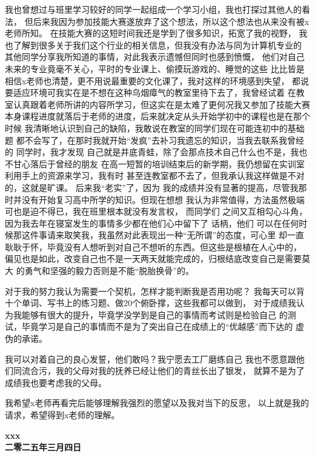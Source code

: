 \documentclass[a4paper]{article}
\begin{document}
我也曾想过与班里学习较好的同学一起组成一个学习小组，我也打探过其他人的看法，
但后来我因为参加技能大赛遂放弃了这个想法，所以这个想法也从来没有被x老师所知。
在技能大赛的这短时间我还是学到了很多知识，拓宽了我的视野，
我也了解到很多关于我们这个行业的相关信息，但我没有办法与同为计算机专业的
其他同学分享我所知道的事情，对此我表示遗憾但同时也感到愤慨，
他们对自己未来的专业竟毫不关心，平时的专业课上、偷摸玩游戏的、睡觉的这些
比比皆是相信x老师也清楚，更不用说最重要的文化课了，我对这样的环境感到失望，
都说要适应环境可我实在是不想在这种乌烟瘴气的教室里待下去了，我曾经试着
在教室认真跟着老师所讲的内容所学习，但这实在是太难了更何况我又参加了技能大赛
本身课程进度就落后于老师的进度，后来就决定从头开始学初中的课程也是在那个时候
我清晰地认识到自己的缺陷，我敢说在教室的同学们现在可能连初中的基础题
都不会写了，在那时我就开始“发疯”去补习我遗忘的知识，当我去联系我曾经的
同学时，我才发现
自己就是井底青蛙，除了会那点技术自己什么也不是，我也不甘心落后于曾经的朋友
在高一短暂的培训结束后的新学期，我仍想留在实训室利用手上的资源来学习，我有时
甚至连教室都不去了，但我承认我这样做是不对的，这就是旷课。
后来我“老实”了，因为
我的成绩并没有显著的提高，尽管我那时并没有开始复习高中所学的知识。但现在想想
我认为非常值得，方法虽然极端可也是迫不得已，我在班里根本就没有发言权，
而同学们
之间又互相勾心斗角，因为我去年在寝室发生的事情多少都在他们心中留下了
话柄，他们
可以在任何时候那这件事请来取笑我，我虽然对此表现出一种“无所谓”的态度，可心里
却一直耿耿于怀，毕竟没有人想听到对自己不想听的东西。但这些是根植在人心中的，
偏见也是如此，改变自己也不是一天两天就能完成的，归根结底改变自己是需要莫大
的勇气和坚强的毅力否则是不能“脱胎换骨”的。

对于我的努力我认为需要一个契机，怎样才能判断我是否用功呢？
我每天可以背十个单词、写书上的练习题、做20个俯卧撑，这些我都可以做到，
对于成绩我认为我能够有很大的提升，毕竟学没学到是自己的事情而考试则是检验自己
的测试，毕竟学习是自己的事情而不是为了突出自己在成绩上的“优越感”而下达的
虚伪的承诺。

我可以对着自己的良心发誓，他们敢吗？我宁愿去工厂磨练自己
我也不愿意跟他们同流合污，我的父母对我的抚养已经让他们的青丝长出了银发，
就算不是为了成绩我也要考虑我的父母。

我希望x老师再看完后能够理解我强烈的愿望以及我对当下的反思，
以上就是我的请求，希望得到x老师的理解。

\begin{flushright}
	\textbf{xxx} \\
    \textbf{二零二五年三月四日}
\end{flushright}
\end{document}
